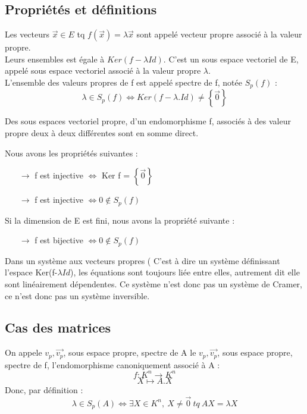 \subsection{Propriétés et définitions}
\begin{de}
Les vecteurs $\overrightarrow{x} \in E$ tq $f(\overrightarrow{x}) = \lambda \overrightarrow{x}$ sont appelé vecteur propre associé à la valeur propre.\\
Leurs ensembles est égale à $Ker(f-\lambda Id)$. C'est un sous espace vectoriel de E, appelé sous espace vectoriel associé à la valeur propre $\lambda$.\\
L'ensemble des valeurs propres de f est appelé spectre de f, notée $S_p(f)$ :
$$\lambda \in S_p(f) \Leftrightarrow Ker(f-\lambda.Id) \neq \left\lbrace \overrightarrow{0} \right\rbrace $$
\end{de}
\begin{theo}
Des sous espaces vectoriel propre, d'un endomorphisme f, associés à des valeur propre deux à deux différentes sont en somme direct. 
\end{theo}
\begin{prop}
Nous avons les propriétés suivantes : 
\begin{itemize}
 \item[$\rightarrow$] f est injective $\Leftrightarrow$ Ker f = $\left\lbrace \overrightarrow{0} \right\rbrace $
 \item[$\rightarrow$] f est injective $\Leftrightarrow 0 \notin S_p(f)$
\end{itemize}
Si la dimension de E est fini, nous avons la propriété suivante : 
\begin{itemize}
  \item[$\rightarrow$] f est bijective $\Leftrightarrow 0 \notin S_p(f)$
\end{itemize}
\end{prop}
\begin{prop}
Dans un système aux vecteurs propres ( C'est à dire un système définissant l'espace Ker(f-$\lambda Id$), les équations sont toujours liée entre elles, autrement dit elle sont linéairement dépendentes. Ce système n'est donc pas un système de Cramer, ce n'est donc pas un système inversible.
\end{prop}

\subsection{Cas des matrices}
On appele $v_p,\overrightarrow{v_p}$, sous espace propre, spectre de A le $v_p,\overrightarrow{v_p}$, sous espace propre, spectre de f, l'endomorphisme canoniquement associé à A : 
$$f : K^n \rightarrow K^n$$
$$ X \mapsto A.X$$
Donc, par définition : 
$$\lambda \in S_p(A) \Leftrightarrow \exists X \in K^n,~ X \neq \overrightarrow{0}~ tq~ AX = \lambda X$$
